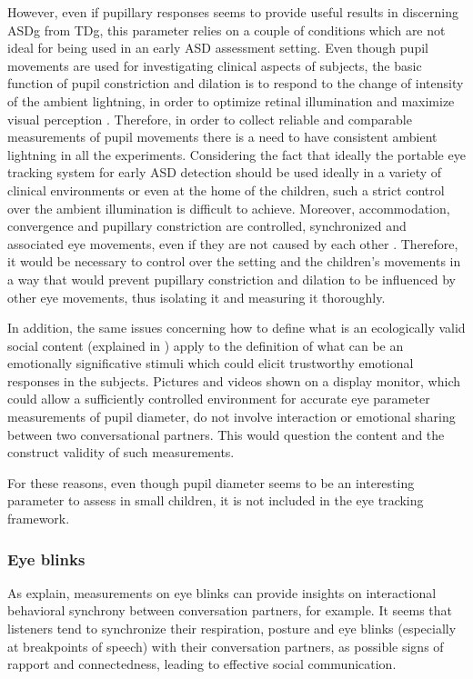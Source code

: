 However, even if pupillary responses seems to provide useful results in discerning ASDg from TDg, this parameter relies on a couple of conditions which are not ideal for being used in an early ASD assessment setting.
Even though pupil movements are used for investigating clinical aspects of subjects, the basic function of pupil constriction and dilation is to respond to the change of intensity of the ambient lightning, in order to optimize retinal illumination and maximize visual perception \citep[p. 502]{adler2011physiology}. Therefore, in order to collect reliable and comparable measurements of pupil movements there is a need to have consistent ambient lightning in all the experiments. Considering the fact that ideally the portable eye tracking system for early ASD detection should be used ideally in a variety of clinical environments or even at the home of the children, such a strict control over the ambient illumination is difficult to achieve. 
Moreover, accommodation, convergence and pupillary constriction are controlled, synchronized and associated eye movements, even if they are not caused by each other \citep[p. 508]{adler2011physiology}. Therefore, it would be necessary to control over the setting and the children's movements in a way that would prevent pupillary constriction and dilation to be influenced by other eye movements, thus isolating it and measuring it thoroughly.

In addition, the same issues concerning how to define what is an ecologically valid social content (explained in ) apply to the definition of what can be an emotionally significative stimuli which could elicit trustworthy emotional responses in the subjects. Pictures and videos shown on a display monitor, which could allow a sufficiently controlled environment for accurate eye parameter measurements of pupil diameter, do not involve interaction or emotional sharing between two conversational partners. This would question the content and the construct validity of such measurements.

For these reasons, even though pupil diameter seems to be an interesting parameter to assess in small children, it is not included in the eye tracking framework.


\subsubsection{Eye blinks}
\label{sec:eyeblinks}
As \cite{nakan02011blinks} explain, measurements on eye blinks can provide insights on interactional behavioral synchrony between conversation partners, for example. It seems that listeners tend to synchronize their respiration, posture and eye blinks (especially at breakpoints of speech) with their conversation partners, as possible signs of rapport and connectedness, leading to effective social communication.

